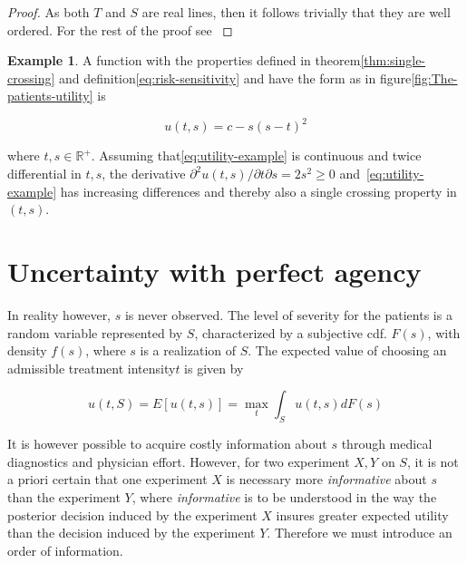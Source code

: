 \documentclass[10pt,a4paper]{article} %
\theoremstyle{definition}
\newtheorem{example}{Example}[section]
\theoremstyle{remark}
\begin{document}
\begin{proof}
As both $T$ and $S$ are real lines, then it follows trivially that they are well ordered. For the rest of the proof see \citet{Milgrom1994}
\end{proof}

\begin{example}
A function with the properties defined in theorem\ref{thm:single-crossing} and definition\ref{eq:risk-sensitivity} and have the form as in figure\ref{fig:The-patients-utility} is

\begin{equation}
u(t,s)=c-s{(s-t)}^{2}\label{eq:utility-example}
\end{equation}

where $t,s\in\mathbb{R}^{+}$. Assuming that\eqref{eq:utility-example} is continuous and twice differential in $t,s$, the derivative $\partial^{2}u(t,s)\big/\partial t\partial s=2s^{2}\ge0$ and~\eqref{eq:utility-example} has increasing differences and thereby also a single crossing property in $(t,s)$.
\end{example}


\section{Uncertainty with perfect agency}

In reality however, $s$ is never observed. The level of severity for the patients is a random variable represented by $S$, characterized by a subjective cdf. $F(s)$, with density $f(s)$, where $s$ is a realization of $S$. The expected value of choosing an admissible treatment intensity$t$ is given by

\begin{equation}
u(t,S)=E[u(t,s)]=\max_{t}\int_{S}u(t,s)dF(s)\label{eq:expected-utility-prior}
\end{equation}

It is however possible to acquire costly information about $s$ through medical diagnostics and physician effort. However, for two experiment $X,Y$ on $S$, it is not a priori certain that one experiment $X$ is necessary more \emph{informative} about $s$ than the experiment $Y$, where \emph{informative} is to be understood in the way the posterior decision induced by the experiment $X$ insures greater expected utility than the decision induced by the experiment $Y$. Therefore we must introduce an order of information.
\end{document}
